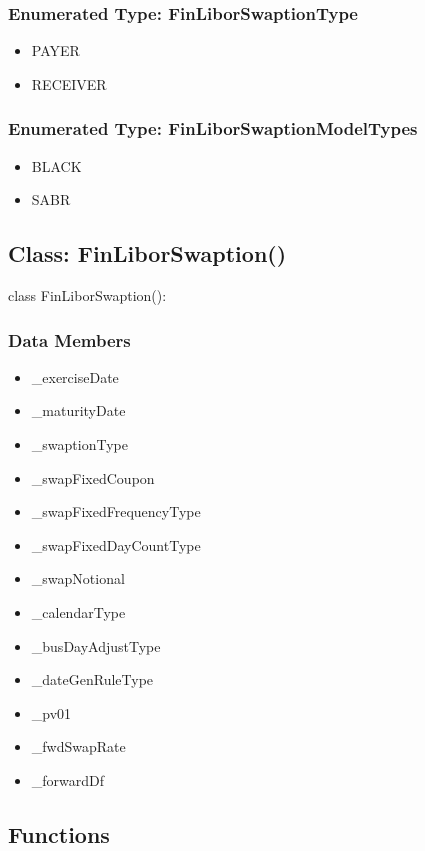 \documentclass[twoside,11pt]{book}
\begin{document}
\subsubsection{Enumerated Type: FinLiborSwaptionType}
\begin{itemize}
\item{PAYER}
\item{RECEIVER}
\end{itemize}

\subsubsection{Enumerated Type: FinLiborSwaptionModelTypes}
\begin{itemize}
\item{BLACK}
\item{SABR}
\end{itemize}

\subsection*{Class: FinLiborSwaption()}
class FinLiborSwaption(): 

\subsubsection*{Data Members}
\begin{itemize}
\item{\_exerciseDate}
\item{\_maturityDate}
\item{\_swaptionType}
\item{\_swapFixedCoupon}
\item{\_swapFixedFrequencyType}
\item{\_swapFixedDayCountType}
\item{\_swapNotional}
\item{\_calendarType}
\item{\_busDayAdjustType}
\item{\_dateGenRuleType}
\item{\_pv01}
\item{\_fwdSwapRate}
\item{\_forwardDf}
\end{itemize}

\subsection*{Functions}
\end{document}
